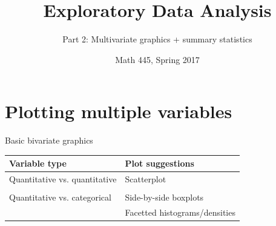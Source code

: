 \documentclass[10pt]{beamer}\usepackage[]{graphicx}\usepackage[]{color}
\title{Exploratory Data Analysis}
\subtitle{Part 2: Multivariate graphics + summary statistics}
\date{}
\author{Math 445, Spring 2017}
\begin{document}
\maketitle


\section{Plotting multiple variables}

\begin{frame}[fragile]{Basic bivariate graphics}

\begin{tabular}{ll} \hline
Variable type & Plot suggestions\\\hline
Quantitative vs. quantitative  & Scatterplot\\
    & \\
Quantitative vs. categorical   & Side-by-side boxplots\\
              & Facetted histograms/densities\\
\hline
\end{tabular}

\end{frame}
\end{document}
